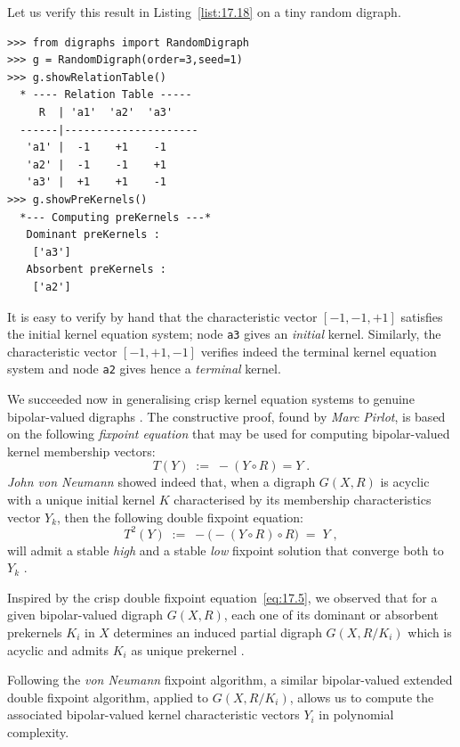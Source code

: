 Let us verify this result in Listing~\vref{list:17.18} on a tiny random digraph.
\begin{lstlisting}[caption={Verifying the kernel equation system on a tiny random digraph},label=list:17.18]
>>> from digraphs import RandomDigraph
>>> g = RandomDigraph(order=3,seed=1)
>>> g.showRelationTable()
  * ---- Relation Table -----
     R  | 'a1'  'a2'  'a3'	  
  ------|---------------------
   'a1' |  -1    +1    -1	 
   'a2' |  -1    -1    +1	 
   'a3' |  +1    +1    -1	 
>>> g.showPreKernels()
  *--- Computing preKernels ---*
   Dominant preKernels :
    ['a3']
   Absorbent preKernels :
    ['a2']
\end{lstlisting}

It is easy to verify by hand that the characteristic vector $[-1, -1, +1]$ satisfies the initial kernel equation system; node \texttt{a3} gives an \emph{initial} kernel. Similarly, the characteristic vector $[-1, +1, -1]$ verifies indeed the terminal kernel equation system and node \texttt{a2} gives hence a \emph{terminal} kernel.

We succeeded now in generalising crisp kernel equation systems to genuine bipolar-valued digraphs \citep*{BIS-2006a,BIS-2006b}. The constructive proof, found by \emph{Marc Pirlot}, is based on the following \emph{fixpoint equation} that may be used for computing bipolar-valued kernel membership vectors:
\begin{equation}\label{eq:17.4}
T(Y) \; := \; -(Y \circ R) = Y\;.
\end{equation}
\emph{John von Neumann} showed indeed that, when a digraph $G(X,R)$ is acyclic with a unique initial kernel $K$ characterised by its membership characteristics vector $Y_k$, then the following double fixpoint equation:
\begin{equation}\label{eq:17.5}
T^2(Y) \; := \; -\big( -(Y \circ R) \circ R) \; = \; Y\;,
\end{equation}
will admit a stable \emph{high} and a stable \emph{low} fixpoint solution that converge both to $Y_k$ \citep{SCH-1985}.

Inspired by the crisp double fixpoint equation~\vref{eq:17.5}, we observed that for a given bipolar-valued digraph $G(X,R)$, each one of its dominant or absorbent prekernels $K_i$ in $X$ determines an induced partial digraph $G(X,R/K_i)$ which is acyclic and admits $K_i$ as unique prekernel \citep{BIS-1997}.

Following the \emph{von Neumann} fixpoint algorithm, a similar bipolar-valued extended double fixpoint algorithm, applied to $G(X,R/K_i)$, allows us to compute the associated bipolar-valued kernel characteristic vectors $Y_i$ in polynomial complexity.

